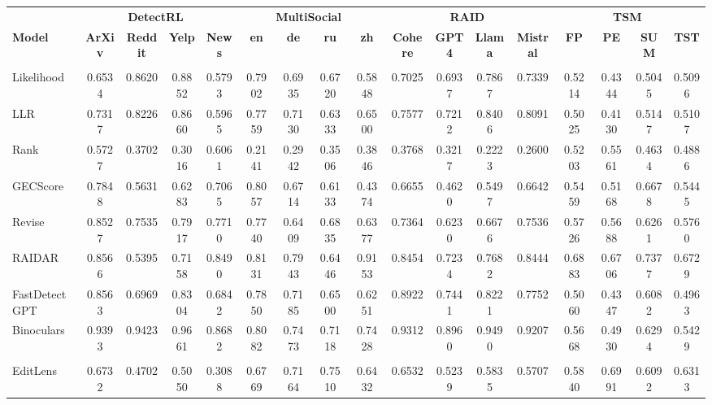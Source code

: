 \begin{tabular}{lcccccccccccccccc}
\toprule
& \multicolumn{4}{c}{\textbf{DetectRL~\citep{wu2024detectrl}}} & \multicolumn{4}{c}{\textbf{MultiSocial~\citep{macko2025multi}}} & \multicolumn{4}{c}{\textbf{RAID~\cite{dugan2024raid}}} & \multicolumn{4}{c}{\textbf{TSM~\citep{quaremba2026tsm}}} \\
\cmidrule(lr){2-5}\cmidrule(lr){6-9}\cmidrule(lr){10-13}\cmidrule(lr){14-17}
\textbf{Model} & \textbf{ArXiv} & \textbf{Reddit} & \textbf{Yelp} & \textbf{News} & \textbf{en} & \textbf{de} & \textbf{ru} & \textbf{zh} & \textbf{Cohere} & \textbf{GPT4} & \textbf{Llama} & \textbf{Mistral} & \textbf{FP} & \textbf{PE} & \textbf{SUM} & \textbf{TST} \\
\midrule
\rowcolor{gray!15} \multicolumn{17}{c}{\textbf{Zero-shot}} \\
\midrule
Likelihood & 0.6534 & 0.8620 & 0.8852 & 0.5793 & 0.7902 & 0.6935 & 0.6720 & 0.5848 & 0.7025 & 0.6937 & 0.7867 & 0.7339 & 0.5214 & 0.4344 & 0.5045 & 0.5096 \\
LLR & 0.7317 & 0.8226 & 0.8660 & 0.5965 & 0.7759 & 0.7130 & 0.6333 & 0.6500 & 0.7577 & 0.7212 & 0.8406 & 0.8091 & 0.5025 & 0.4130 & 0.5147 & 0.5107 \\
Rank & 0.5727 & 0.3702 & 0.3016 & 0.6061 & 0.2141 & 0.2942 & 0.3506 & 0.3846 & 0.3768 & 0.3217 & 0.2223 & 0.2600 & 0.5203 & 0.5561 & 0.4634 & 0.4886 \\
GECScore & 0.7848 & 0.5631 & 0.6283 & 0.7065 & 0.8057 & 0.6714 & 0.6133 & 0.4374 & 0.6655 & 0.4620 & 0.5497 & 0.6642 & 0.5459 & 0.5168 & 0.6678 & 0.5445 \\
Revise & 0.8527 & 0.7535 & 0.7917 & 0.7710 & 0.7740 & 0.6409 & 0.6835 & 0.6377 & 0.7364 & 0.6230 & 0.6676 & 0.7536 & 0.5726 & 0.5688 & 0.6261 & 0.5760 \\
RAIDAR & 0.8566 & 0.5395 & 0.7158 & 0.8490 & 0.8131 & 0.7943 & 0.6446 & 0.9153 & 0.8454 & 0.7234 & 0.7682 & 0.8444 & 0.6883 & 0.6706 & 0.7377 & 0.6729 \\
FastDetectGPT & 0.8563 & 0.6969 & 0.8304 & 0.6842 & 0.7850 & 0.7185 & 0.6500 & 0.6251 & 0.8922 & 0.7441 & 0.8221 & 0.7752 & 0.5060 & 0.4347 & 0.6082 & 0.4963 \\
Binoculars & 0.9393 & 0.9423 & 0.9661 & 0.8682 & 0.8082 & 0.7473 & 0.7118 & 0.7428 & 0.9312 & 0.8960 & 0.9490 & 0.9207 & 0.5668 & 0.4930 & 0.6294 & 0.5429 \\
\midrule
\rowcolor{gray!15} \multicolumn{17}{c}{\textbf{Supervised}} \\
\midrule
EditLens & 0.6732 & 0.4702 & 0.5050 & 0.3088 & 0.6769 & 0.7164 & 0.7510 & 0.6432 & 0.6532 & 0.5239 & 0.5835 & 0.5707 & 0.5840 & 0.6991 & 0.6092 & 0.6313 \\

\end{tabular}
